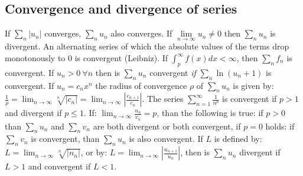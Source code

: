 \subsection{Convergence and divergence of series}
If $\sum\limits_n|u_n|$ converges, $\sum\limits_n u_n$ also converges.
\npar
If $\lim\limits_{n\rightarrow\infty}u_n\neq0$ then $\sum\limits_n u_n$ is divergent.
\npar
An alternating series of which the absolute values of the terms drop
monotonously to 0 is convergent (Leibniz).
\npar
If $\int_p^{\infty}f(x)dx<\infty$, then $\sum\limits_n f_n$ is convergent.
\npar
If $u_n>0~\forall n$ then is $\sum\limits_n u_n$ convergent {\it if}
$\sum\limits_n\ln(u_n+1)$ is convergent.
\npar
If $u_n=c_nx^n$ the radius of convergence $\rho$ of
$\sum\limits_n u_n$ is given by:
$\displaystyle\frac{1}{\rho}=\lim_{n\rightarrow\infty}\sqrt[n]{|c_n|}=
\lim_{n\rightarrow\infty}\left|\frac{c_{n+1}}{c_n}\right|$.
\npar
The series $\displaystyle\sum_{n=1}^\infty \frac{1}{n^p}$ is convergent if
$p>1$ and divergent if $p\leq1$.
\npar
If: $\displaystyle\lim_{n\rightarrow\infty}\frac{u_n}{v_n}=p$,
than the following is true: if $p>0$ than $\sum\limits_{n}u_n$ and $\sum\limits_{n}v_n$
are both divergent or both convergent, if $p=0$ holds: if $\sum\limits_{n}v_n$
is convergent, than $\sum\limits_{n}u_n$ is also convergent.
\npar
If $L$ is defined by:
$\displaystyle L=\lim_{n\rightarrow\infty}\sqrt[n]{|n_n|}$, or by:
$\displaystyle L=\lim_{n\rightarrow\infty}\left|\frac{u_{n+1}}{u_n}\right|$,
then is $\sum\limits_{n}u_n$ divergent if $L>1$ and convergent if $L<1$.

